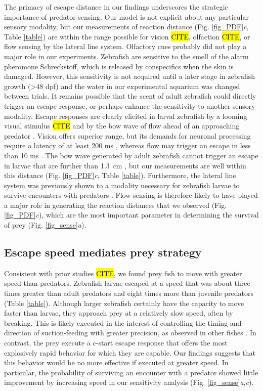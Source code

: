 \documentclass[]{rsos}%
\begin{document}
The primacy of escape distance in our findings underscores the strategic importance of predator sensing. 
Our model is not explicit about any particular sensory modality, but our measurements of reaction distance (Fig. \ref{fig_PDF}\textit{c}, Table \ref{table}) are within the range possible for vision \hl{CITE}, olfaction \hl{CITE}, or flow sensing by the lateral line system.
Olfactory cues probably did not play a major role in our experiments. 
Zebrafish are sensitive to the smell of the alarm pheromone Schreckstoff, which is released by conspecifics when the skin is damaged. 
However, this sensitivity is not acquired until a later stage in zebrafish growth (>48 dpf)\cite{Waldman:1982ic} and the water in our experimental aquarium was changed between trials.
It remains possible that the scent of adult zebrafish could directly trigger an escape response, or perhaps enhance the sensitivity to another sensory modality.
Escape responses are clearly elicited in larval zebrafish by a looming visual stimulus \hl{CITE} and by the bow wave of flow ahead of an approaching predator \cite{Stewart:2014cma}.
Vision offers superior range, but its demands for neuronal processing require a latency of at least 200 ms \cite{Burgess:2007vp}, whereas flow may trigger an escape in less than 10 ms \cite{Liu:1999fs}.
The bow wave generated by adult zebrafish cannot trigger an escape in larvae that are further than \SI{1.3}{\cm} \cite{Stewart:2014cma}, but our measurements are well within this distance (Fig. \ref{fig_PDF}\textit{c}, Table \ref{table}).
Furthermore, the lateral line system was previously shown to a  modality necessary for zebrafish larvae to survive encounters with predators \cite{Stewart:2013bha}.
Flow sensing is therefore likely to have played a major role in generating the reaction distances that we observed (Fig. \ref{fig_PDF}\textit{c}), which are the most important parameter in determining the survival of prey (Fig. \ref{fig_sense}\textit{a}).

\subsection{Escape speed mediates prey strategy} 

Consistent with prior studies \cite{Stewart:2013bha} \hl{CITE}, we found prey fish to move with greater speed than predators.
Zebrafish larvae escaped at a speed that was about three times greater than adult predators and eight times more than juvenile predators (Table \ref{table}).
Although larger zebrafish certainly have the capacity to move faster than larvae, they approach prey at a relatively slow speed, often by breaking.
This is likely executed in the interest of controlling the timing and direction of suction-feeding with greater precision, as observed in other fishes \cite{Higham:2005iu,Higham:2007go}.
In contrast, the prey execute a c-start escape response that offers the most explosively rapid behavior for which they are capable.
Our findings suggests that this behavior would be no more effective if executed at greater speed.
In particular, the probability of surviving an encounter with a predator showed little improvement by increasing speed in our sensitivity analysis (Fig. \ref{fig_sense}\textit{a},\textit{c}).
\end{document}
